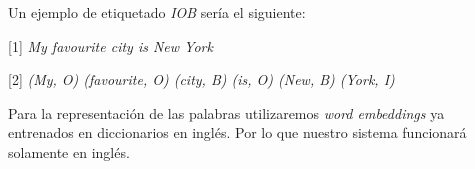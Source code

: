 	Un ejemplo de etiquetado \textit{IOB} sería el siguiente:
	
	\begin{center}
		\begin{minipage}{0.9\linewidth}
			\vspace{5pt}%
			{\small
				[1] \textit{My favourite city is New York}
				
				[2] \textit{(My, O) (favourite, O)  (city, B) (is, O) (New, B) (York, I)}
			}
			\vspace{5pt}%
		\end{minipage}
	\end{center}
	
	
	Para la representación de las palabras utilizaremos \textit{word embeddings} ya entrenados en diccionarios en inglés. Por lo que nuestro sistema funcionará solamente en inglés.
	

		

	
